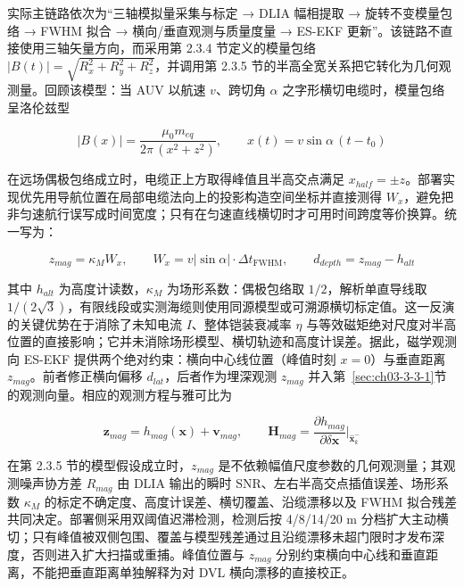 实际主链路依次为``三轴模拟量采集与标定 → DLIA 幅相提取 → 旋转不变模量包络 → FWHM 拟合 → 横向/垂直观测与质量度量 → ES-EKF 更新''。该链路不直接使用三轴矢量方向，而采用第 2.3.4 节定义的模量包络 \(|B(t)| = \sqrt{R_x^2 + R_y^2 + R_z^2}\)，并调用第 2.3.5 节的半高全宽关系把它转化为几何观测量。回顾该模型：当 AUV 以航速 \(v\)、跨切角 \(\alpha\) 之字形横切电缆时，模量包络呈洛伦兹型

\begin{equation}
|B(x)| = \frac{\mu_0 m_{eq}}{2\pi\,(x^2 + z^2)}, \qquad x(t) = v\sin\alpha\,(t - t_0)
\label{eq:ch03-lorentz-envelope}
\end{equation}

在远场偶极包络成立时，电缆正上方取得峰值且半高交点满足 \(x_{half} = \pm z\)。部署实现优先用导航位置在局部电缆法向上的投影构造空间坐标并直接测得 \(W_x\)，避免把非匀速航行误写成时间宽度；只有在匀速直线横切时才可用时间跨度等价换算。统一写为：

\begin{equation}
z_{mag} = \kappa_M W_x,\qquad
W_x=v|\sin\alpha|\cdot\Delta t_{\mathrm{FWHM}},\qquad
d_{depth} = z_{mag} - h_{alt}
\label{eq:ch03-fwhm-depth}
\end{equation}

其中 \(h_{alt}\) 为高度计读数，\(\kappa_M\) 为场形系数：偶极包络取 \(1/2\)，解析单直导线取 \(1/(2\sqrt{3})\)，有限线段或实测海缆则使用同源模型或可溯源横切标定值。这一反演的关键优势在于消除了未知电流 \(I\)、整体铠装衰减率 \(\eta\) 与等效磁矩绝对尺度对半高位置的直接影响；它并未消除场形模型、横切轨迹和高度计误差。据此，磁学观测向 ES-EKF 提供两个绝对约束：横向中心线位置（峰值时刻 \(x = 0\)）与垂直距离 \(z_{mag}\)。前者修正横向偏移 \(d_{lat}\)，后者作为埋深观测 \(z_{mag}\) 并入第~\ref{sec:ch03-3-3-1}节的观测向量。相应的观测方程与雅可比为

\begin{equation}
\boldsymbol{z}_{mag} = h_{mag}(\boldsymbol{x}) + \boldsymbol{v}_{mag}, \qquad \boldsymbol{H}_{mag} = \frac{\partial h_{mag}}{\partial \delta\boldsymbol{x}}\bigg|_{\hat{\boldsymbol{x}}_k^-}
\label{eq:ch03-mag-observation}
\end{equation}

在第 2.3.5 节的模型假设成立时，\(z_{mag}\) 是不依赖幅值尺度参数的几何观测量；其观测噪声协方差 \(R_{mag}\) 由 DLIA 输出的瞬时 SNR、左右半高交点插值误差、场形系数 \(\kappa_M\) 的标定不确定度、高度计误差、横切覆盖、沿缆漂移以及 FWHM 拟合残差共同决定。部署侧采用双阈值迟滞检测，检测后按 4/8/14/20 m 分档扩大主动横切；只有峰值被双侧包围、覆盖与模型残差通过且沿缆漂移未超门限时才发布深度，否则进入扩大扫描或重捕。峰值位置与 \(z_{mag}\) 分别约束横向中心线和垂直距离，不能把垂直距离单独解释为对 DVL 横向漂移的直接校正。


